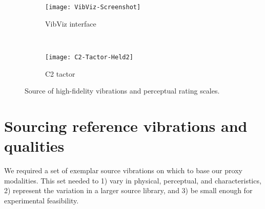 \begin{figure}[tb]
\begin{subfigure}{0.28\textwidth}
        		\centering
	    	 \texttt{[image: VibViz-Screenshot]}
            \caption{VibViz interface ~\cite{Seifi2015}}
            \label{fig:vibviz}
         \end{subfigure}~
	\begin{subfigure}{0.19\textwidth}
    	\centering
     	 \texttt{[image: C2-Tactor-Held2]}
            \caption{C2 tactor}
            \label{fig:c2tactor}
         \end{subfigure}
            \label{fig:approach}
            \caption{Source of high-fidelity vibrations and perceptual rating scales.}
\end{figure}

\vspace{0.25in}
\section{Sourcing reference vibrations and qualities}%


We required a set of exemplar source vibrations on which to base our proxy modalities. 
This set needed to
1) vary in physical, perceptual, and %
 characteristics,
2) represent the variation in a larger source library, and
3) be small enough for experimental feasibility.


